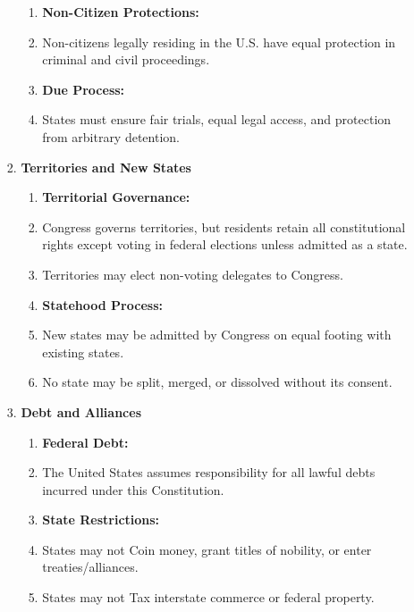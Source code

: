 \documentclass{article}
\begin{document}
\begin{multicols}{2}
\begin{enumerate}[label=\Alph*)]
\begin{enumerate}[label=\Alph*), start=4]
\begin{enumerate}[label=\Alph*), start=8]
\begin{enumerate}[label=3.4.\arabic*]
        \item[] \textbf{Non-Citizen Protections:}
        \item Non-citizens legally residing in the U.S. have equal protection in criminal and civil proceedings.
        
        \item[] \textbf{Due Process:}
        \item States must ensure fair trials, equal legal access, and protection from arbitrary detention.
    \end{enumerate}
    
    \item \textbf{Territories and New States}
    
    \begin{enumerate}[label=3.5.\arabic*]
        \item[] \textbf{Territorial Governance:}
        \item Congress governs territories, but residents retain all constitutional rights except voting in federal elections unless admitted as a state.
        
        \item Territories may elect non-voting delegates to Congress.
        
        \item[] \textbf{Statehood Process:}
        \item New states may be admitted by Congress on equal footing with existing states.
        
        \item No state may be split, merged, or dissolved without its consent.
    \end{enumerate}
    
    \item \textbf{Debt and Alliances}
    
    \begin{enumerate}[label=3.6.\arabic*]
        \item[] \textbf{Federal Debt:}
        \item The United States assumes responsibility for all lawful debts incurred under this Constitution.
        
        \item[] \textbf{State Restrictions:}
        \item States may not Coin money, grant titles of nobility, or enter treaties/alliances.
        
        \item States may not Tax interstate commerce or federal property.
    \end{enumerate}
\end{enumerate}



\end{enumerate}
\end{enumerate}
\end{multicols}
\end{document}

